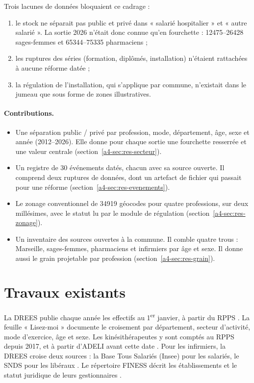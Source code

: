 Trois lacunes de données bloquaient ce cadrage :
\begin{enumerate}
  \item le stock ne séparait pas public et privé dans « salarié hospitalier » et « autre salarié ». La sortie
  2026 n'était donc connue qu'en fourchette : \num{12475}--\num{26428} sages-femmes et
  \num{65344}--\num{75335} pharmaciens\mesure{} ;
  \item les ruptures des séries (formation, diplômés, installation) n'étaient rattachées à aucune réforme datée ;
  \item la régulation de l'installation, qui s'applique par commune, n'existait dans le jumeau que sous forme de
  zones illustratives.
\end{enumerate}

\paragraph{Contributions.}
\begin{itemize}
  \item Une séparation public / privé par profession, mode, département, âge, sexe et année (2012--2026). Elle
  donne pour chaque sortie une fourchette resserrée et une valeur centrale (section~\ref{a4-sec:res-secteur}).
  \item Un registre de 30 événements datés, chacun avec sa source ouverte. Il comprend deux ruptures de données,
  dont un artefact de fichier qui passait pour une réforme (section~\ref{a4-sec:res-evenements}).
  \item Le zonage conventionnel de \num{34919} géocodes pour quatre professions, sur deux millésimes, avec le
  statut lu par le module de régulation (section~\ref{a4-sec:res-zonage}).
  \item Un inventaire des sources ouvertes à la commune. Il comble quatre trous : Marseille, sages-femmes,
  pharmaciens et infirmiers par âge et sexe. Il donne aussi le grain projetable par profession
  (section~\ref{a4-sec:res-grain}).
\end{itemize}

\section{Travaux existants}
La DREES publie chaque année les effectifs au 1\textsuperscript{er} janvier, à partir du RPPS
\citep{a4-drees2026demo}. La feuille « Lisez-moi » documente le croisement par département, secteur d'activité,
mode d'exercice, âge et sexe. Les kinésithérapeutes y sont comptés au RPPS depuis 2017, et à partir d'ADELI
avant cette date \citep{a4-drees2020er1159}. Pour les infirmiers, la DREES croise deux sources : la Base Tous Salariés
(Insee) pour les salariés, le SNDS pour les libéraux \citep{a4-dreesbts2026}. Le répertoire FINESS décrit les
établissements et le statut juridique de leurs gestionnaires \citep{a4-finessEt2026,a4-finessEj2026}.

